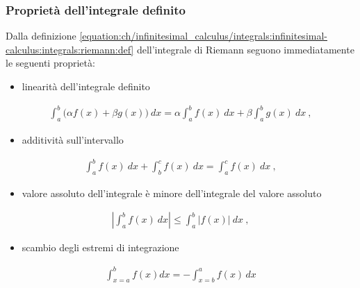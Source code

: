 \documentclass[letterpaper,10pt,italian]{jupyterBook}
\begin{document}
\subsubsection{Proprietà dell’integrale definito}
\label{\detokenize{ch/infinitesimal_calculus/integrals:proprieta-dell-integrale-definito}}\label{\detokenize{ch/infinitesimal_calculus/integrals:infinitesimal-calculus-integrals-def-definite-prop}}
\sphinxAtStartPar
Dalla definizione \eqref{equation:ch/infinitesimal_calculus/integrals:infinitesimal-calculus:integrals:riemann:def} dell’integrale di Riemann seguono immediatamente le seguenti proprietà:
\begin{itemize}
\item {} 
\sphinxAtStartPar
linearità dell’integrale definito

\end{itemize}
\begin{equation}\label{equation:ch/infinitesimal_calculus/integrals:infinitesimal-calculus:integrals:prop:linearity}
\begin{split}\int_a^b \big( \alpha f(x) + \beta g(x) \big) \ dx = \alpha \int_a^b f(x) \ dx + \beta \int_a^b g(x) \ dx \ ,\end{split}
\end{equation}\begin{itemize}
\item {} 
\sphinxAtStartPar
additività sull’intervallo

\end{itemize}
\begin{equation}\label{equation:ch/infinitesimal_calculus/integrals:infinitesimal-calculus:integrals:prop:add}
\begin{split}\int_a^b f(x) \ dx + \int_b^c f(x) \ dx = \int_a^c f(x) \ dx \ ,\end{split}
\end{equation}\begin{itemize}
\item {} 
\sphinxAtStartPar
valore assoluto dell’integrale è minore dell’integrale del valore assoluto

\end{itemize}
\begin{equation}\label{equation:ch/infinitesimal_calculus/integrals:infinitesimal-calculus:integrals:prop:abs}
\begin{split}\left| \int_a^b f(x) \ dx \right| \le \int_a^b | f(x) | \ dx \ ,\end{split}
\end{equation}\begin{itemize}
\item {} 
\sphinxAtStartPar
scambio degli estremi di integrazione

\end{itemize}
\begin{equation}\label{equation:ch/infinitesimal_calculus/integrals:infinitesimal-calculus:integrals:prop:swap}
\begin{split}\int_{x=a}^{b} f(x) dx = - \int_{x=b}^{a} f(x) \, dx\end{split}
\end{equation}
\end{document}
